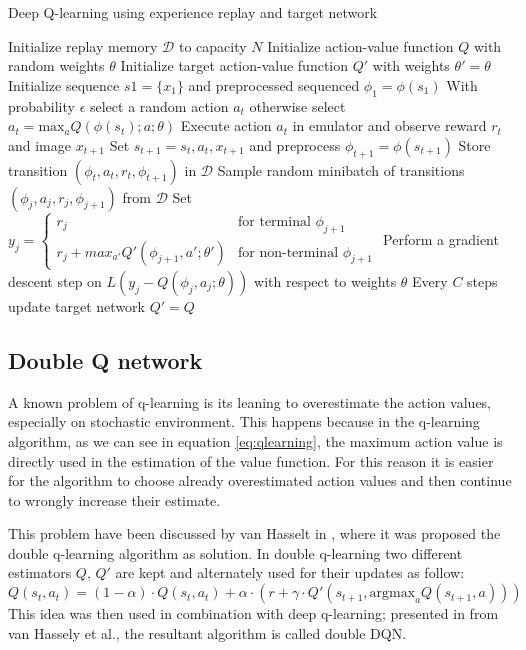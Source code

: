 \documentclass[article,11pt]{article}
\begin{document}
	\begin{algorithm}
		\caption{Deep Q-learning using experience replay and target network}
		\label{alg:dqn}
		\small
		\begin{algorithmic}
		\STATE Initialize replay memory $\mathcal{D}$ to capacity $N$
		\STATE Initialize action-value function $Q$ with random weights $\theta$
		\STATE Initialize target action-value function $Q'$ with weights $\theta'=\theta$
		\STATE Initialize sequence $s1 = \{x_1\}$ and preprocessed sequenced $\phi_1 = \phi(s_1)$
		\STATE With probability $\epsilon$ select a random action $a_t$
		\STATE otherwise select $a_t = \text{max}_a Q(\phi(s_t); a; \theta)$
		\STATE Execute action $a_t$ in emulator and observe reward $r_t$ and image $x_{t+1}$
		\STATE Set $s_{t+1} = s_t, a_t, x_{t+1}$ and preprocess $\phi_{t+1} = \phi(s_{t+1})$
		\STATE Store transition $(\phi_t, a_t, r_t, \phi_{t+1})$ in $\mathcal{D}$
		\STATE Sample random minibatch of transitions $(\phi_j, a_j, r_j, \phi_{j+1})$ from $\mathcal{D}$
		\STATE Set $y_j =
		\begin{cases}
			r_j & \text{for terminal } \phi_{j+1} \\
			r_j + max_{a'} Q'(\phi_{j+1}, a'; \theta') & \text{for non-terminal } \phi_{j+1}
		\end{cases}$
		\STATE Perform a gradient descent step on $L(y_j - Q(\phi_j, a_j ; \theta))$ with respect to weights $\theta$ 
		\STATE Every $C$ steps update target network $Q'=Q$
		\ENDFOR
		\ENDFOR
		\end{algorithmic}
	\end{algorithm}

	\subsection{Double Q network}
	A known problem of q-learning is its leaning to overestimate the action values, especially on stochastic environment. This happens because in the q-learning algorithm, as we can see in equation \ref{eq:qlearning}, the maximum action value is directly used in the estimation of the value function. For this reason it is easier for the algorithm to choose already overestimated action values and then continue to wrongly increase their estimate.
	
	This problem have been discussed by van Hasselt in \cite{doubleq}, where it was proposed the double q-learning algorithm as solution. In double q-learning two different estimators $Q$, $Q'$ are kept and alternately used for their updates as follow:
	\begin{equation}
		\label{eq:doubleq}
		Q(s_t, a_t)=(1-\alpha)\cdot Q(s_t, a_t) + \alpha \cdot (r + \gamma\cdot Q'(s_{t+1}, \text{argmax}_aQ(s_{t+1}, a)))
	\end{equation}
	This idea was then used in combination with deep q-learning; presented in \cite{doubledqn} from van Hassely et al., the resultant algorithm is called double DQN.
	
\end{document}
